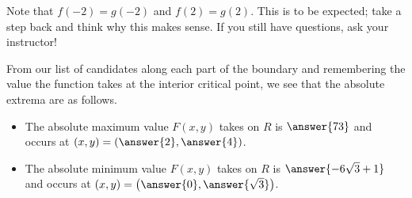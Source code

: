 \documentclass{ximera}
\begin{document}
\begin{exercise}
\begin{exercise}
\begin{exercise}
\begin{exercise}
\begin{exercise}
Note that $f(-2) = g(-2)$ and $f(2) = g(2)$.  This is to be expected; take a step back and think why this makes sense.  If you still have questions, ask your instructor!

\end{exercise}

From our list of candidates along each part of the boundary and remembering the value the function takes at the interior critical point, we see that the absolute extrema are as follows.

\begin{itemize}
\item The absolute maximum value $F(x,y)$ takes on $R$ is $ \answer{73}  $ and occurs at $(x,y) = \left( \answer{2} , \answer{4} \right)$.
\item The absolute minimum value $F(x,y)$ takes on $R$ is $ \answer{-6 \sqrt{3}+1}  $ and occurs at $(x,y) = \left( \answer{0} , \answer{\sqrt{3}} \right)$.
\end{itemize}
\end{exercise}

\end{exercise}




\end{exercise}
\end{exercise}
\end{document}
